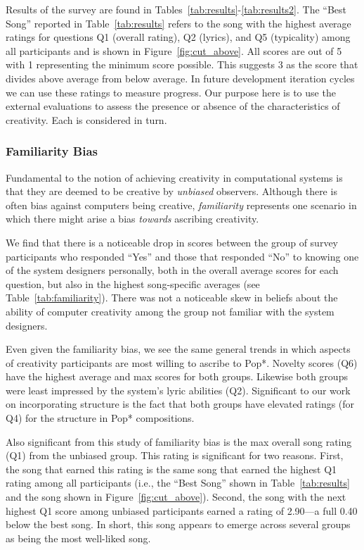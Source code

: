 \documentclass[phd,electronic,oneside,twosidetoc,letterpaper,chaptercenter,parttop,lol,lof,lot]{byumsphd}
\begin{document}
Results of the survey are found in Tables~\ref{tab:results}-\ref{tab:results2}. The ``Best Song'' reported in Table~\ref{tab:results} refers to the song with the highest average ratings for questions Q1 (overall rating), Q2 (lyrics), and Q5 (typicality) among all participants and is shown in Figure~\ref{fig:cut_above}. All scores are out of 5 with 1 representing the minimum score possible. This suggests 3 as the score that divides above average from below average. In future development iteration cycles we can use these ratings to measure progress. Our purpose here is to use the external evaluations to assess the presence or absence of the characteristics of creativity. Each is considered in turn.

\subsubsection{Familiarity Bias}

Fundamental to the notion of achieving creativity in computational systems is that they are deemed to be creative by \textit{unbiased} observers. Although there is often bias against computers being creative, \textit{familiarity} represents one scenario in which there might arise a bias \textit{towards} ascribing creativity.

We find that there is a noticeable drop in scores between the group of survey participants who responded ``Yes'' and those that responded ``No'' to knowing one of the system designers personally, both in the overall average scores for each question, but also in the highest song-specific averages (see Table~\ref{tab:familiarity}). There was not a noticeable skew in beliefs about the ability of computer creativity among the group not familiar with the system designers.

Even given the familiarity bias, we see the same general trends in which aspects of creativity participants are most willing to ascribe to Pop*. Novelty scores (Q6) have the highest average and max scores for both groups. Likewise both groups were least impressed by the system's lyric abilities (Q2). Significant to our work on incorporating structure is the fact that both groups have elevated ratings (for Q4) for the structure in Pop* compositions.

Also significant from this study of familiarity bias is the max overall song rating (Q1) from the unbiased group. This rating is significant for two reasons. First, the song that earned this rating is the same song that earned the highest Q1 rating among all participants (i.e., the ``Best Song'' shown in Table~\ref{tab:results} and the song shown in Figure~\ref{fig:cut_above}). Second, the song with the next highest Q1 score among unbiased participants earned a rating of 2.90---a full 0.40 below the best song. In short, this song appears to emerge across several groups as being the most well-liked song.
\end{document}
